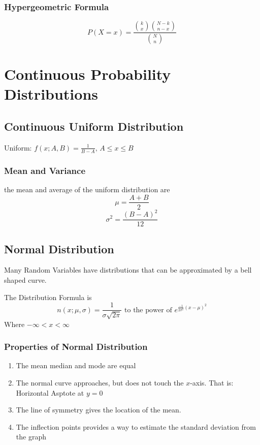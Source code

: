 \documentclass{book}
\begin{document}
\subsection{Hypergeometric Formula}
$$P(X=x) = \frac{{k \choose x}{N-k \choose n-x}}{{N \choose n}}$$

\chapter{Continuous Probability Distributions}

\section{Continuous Uniform Distribution}

Uniform: $f(x;A,B)=\frac{1}{B-A}\text{, }A \le x \le B$

\subsection{Mean and Variance}
the mean and average of the uniform distribution are
$$\mu=\frac{A+B}{2}$$
$$\sigma^2=\frac{(B-A)^2}{12}$$

\section{Normal Distribution}

Many Random Variables have distributions that can be approximated by a bell shaped curve.

The Distribution Formula is
$$n(x;\mu, \sigma) = \frac{1}{\sigma \sqrt{2\pi}}
\text{ to the power of }{e}^{\frac{-1}{2\sigma^2}(x-\mu)^2}$$
Where $-\infty < x < \infty$

\subsection{Properties of Normal Distribution}
\begin{enumerate}
\item The mean median and mode are equal
\item The normal curve approaches, but does not touch the $x$-axis. That is: Horizontal Asptote at $y=0$
\item The line of symmetry gives the location of the mean.
\item The inflection points provides a way to estimate the standard deviation from the graph
\end{enumerate}
\end{document}
